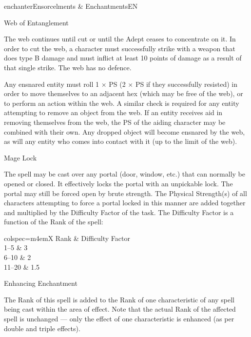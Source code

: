 \begin{College}[1.1]{enchanter}{Ensorcelments \& Enchantments}{EN}
\begin{spell}[S-5]{Web of Entanglement}
\begin{effects}
The web continues until cut or until the Adept ceases to concentrate
on it. In order to cut the web, a character must successfully strike
with a weapon that does type B damage and must inflict at least 10
points of damage as a result of that single strike.  The web has no
defence.

Any ensnared entity must roll 1 × PS (2 × PS if they successfully
resisted) in order to move themselves to an adjacent hex (which may
be free of the web), or to perform an action within the web.  A
similar check is required for any entity attempting to remove an
object from the web.  If an entity receives aid in removing themselves
from the web, the PS of the aiding character may be combined with
their own.  Any dropped object will become ensnared by the web, as
will any entity who comes into contact with it (up to the limit of the
web).
\end{effects}
\end{spell}

\begin{spell}[S-6]{Mage Lock}

\begin{effects}
The spell may be cast over any portal (door, window, etc.)  that can
normally be opened or closed.  It effectively locks the portal with an
unpickable lock.  The portal may still be forced open by brute
strength.  The Physical Strength(s) of all characters attempting to
force a portal locked in this manner are added together and multiplied
by the Difficulty Factor of the task.  The Difficulty Factor is a
function of the Rank of the spell:
\begin{dqtblr}{colspec={m{4em}X}}
Rank	& Difficulty Factor \\
1--5	& 3 \\
6--10	& 2 \\ 
11--20	& 1.5 \\
\end{dqtblr}
\end{effects}
\end{spell}

\begin{spell}[S-7]{Enhancing Enchantment}
\begin{effects}
The Rank of this spell is added to the Rank of one characteristic of
any spell being cast within the area of effect. Note that the actual
Rank of the affected spell is unchanged --- only the effect of one
characteristic is enhanced (as per double and triple effects).


\end{effects}
\end{spell}
\end{College}
